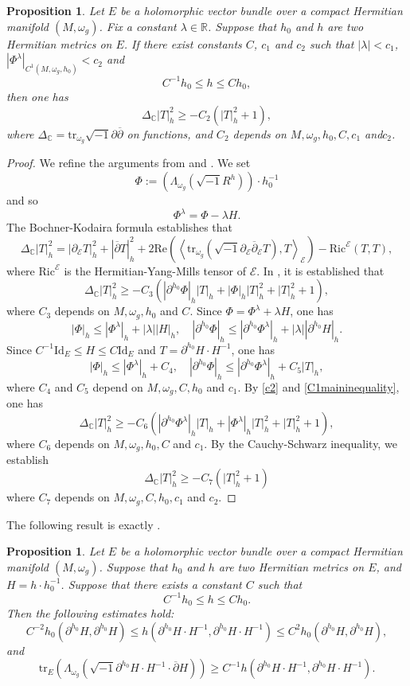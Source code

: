 \documentclass[12pt, reqno]{amsart}
\newcommand\sE{{\mathscr E}}
\newcommand\bp{{\bar\partial}}
\theoremstyle{plain}
\newtheorem{prop}[thm]{Proposition}
\theoremstyle{definition}
\newcommand{\bproposition}{\begin{prop}}
\newcommand{\eproposition}{\end{prop}}
\newcommand{\bproof}{\begin{proof}}
\newcommand{\eproof}{\end{proof}}
\newcommand{\sq}{\sqrt{-1}}
\newcommand{\p}{\partial}
\renewcommand{\bar}{\overline}
\newcommand{\beq}{\begin{equation}}
\newcommand{\eeq}{\end{equation}}
\renewcommand{\bp}{\bar{\partial}}
\renewcommand{\>}{\rightarrow}
\newcommand{\C}{{\mathbb C}}
\newcommand{\R}{{\mathbb R}}
\renewcommand{\>}{\rightarrow}
\renewcommand{\p}{{\partial}}
\renewcommand{\bp}{{\bar{\partial}}}
\newcommand{\om}{\omega}
\renewcommand{\bar}{\overline}
\newcommand{\smo}{\sqrt{-1}}
\numberwithin{equation}{section} %
\begin{document}
\bproposition
\label{DeltaS} Let $E$ be a holomorphic vector bundle over  a compact Hermitian manifold $(M,\omega_g)$. Fix a constant $\lambda\in \R$.  Suppose that $h_0$ and $h$ are two Hermitian metrics on $E$.   If there exist constants  $C$, $c_1$ and $c_2$ such that $|\lambda|<c_1$, $|\Phi^\lambda|_{C^1(M,\omega_g, h_0)}<c_2$
and 
\beq C^{-1}h_0\leq h\leq Ch_0, \eeq
then
one has
\beq \Delta_{\C} |T|_h^2\geq - C_{2}\left(|T|^2_h+1\right), \eeq
where $\Delta_\C =\mathrm{tr}_{\omega_g}\sq \p\bp$ on functions, and $C_{2}$ depends on $M,\omega_g,  h_0, C, c_1$ and$ c_2$.
\eproposition

\bproof We refine the arguments from \cite{WYY26+} and \cite{FWYY26+}.  We set $$ \Phi:= \left(\Lambda_{\omega_g}\left(\smo R^{{h}}\right)\right)\cdot h_0^{-1}$$ and so
\beq \Phi^\lambda=\Phi-\lambda H.\eeq
The Bochner-Kodaira formula establishes that
\beq \Delta_{\C} |T|_h^2 = |\p_\sE T|_h^2 + |\bar\p T|_h^2 + 2\mathrm{Re}\left(\left\langle \mathrm{tr}_{\omega_g}\left(\smo \p_\sE\bar\p_\sE T\right), T \right\rangle_\sE \right) - \mathrm{Ric}^\sE(T,T),\label{c30} \eeq
where $\mathrm{Ric}^\sE$ is the Hermitian-Yang-Mills tensor of $\sE$. In \cite[Proposition~4.6]{FWYY26+}, it is established that
\beq \Delta_{\C} |T|_h^2 \geq -C_{3}\left(|\p^{h_0}\Phi|_h|T|_h+ |\Phi|_h |T|^2_h+|T|^2_h+1\right), \label{C1maininequality} \eeq
where $C_{3}$  depends on $M, \omega_g, h_0$ and $C$.
Since $\Phi=\Phi^\lambda+\lambda H$, one has
\beq
|\Phi|_h\leq |\Phi^\lambda|_h+|\lambda||H|_h, \quad
|\p^{h_0}\Phi|_h\leq |\p^{h_0}\Phi^\lambda|_h+|\lambda||\p^{h_0}H|_h.
\eeq
Since
$C^{-1}\mathrm{Id}_E\leq H\leq C\mathrm{Id}_E$ and $ T=\p^{h_0}H\cdot H^{-1}$,
one has
\beq
|\Phi|_h\leq |\Phi^\lambda|_h+C_4, \quad
|\p^{h_0}\Phi|_h\leq |\p^{h_0}\Phi^\lambda|_h+C_5|T|_h,\label{c2}
\eeq
where $C_4$ and $C_5$ depend on $M,\om_g,C,h_0$ and $c_1$. By \eqref{c2} and \eqref{C1maininequality}, one has
\beq
\Delta_{\C} |T|_h^2 \geq-C_{6}\left(|\p^{h_0}\Phi^\lambda|_h|T|_h+|\Phi^\lambda|_h|T|^2_h +|T|^2_h+1\right),
\eeq
where $C_{6}$  depends on $M, \omega_g, h_0, C$ and $c_1$. By   the  Cauchy-Schwarz inequality,  we establish   \beq \Delta_{\C} |T|_h^2\geq - C_{7}\left(|T|^2_h+1\right) \eeq
where $ C_{7}$ depends on $M,\omega_g, C, h_0,c_1$ and $c_2$.
\eproof


\noindent The following result is exactly \cite[Proposition~4.4]{FWYY26+}.

\bproposition
\label{W12estimate}   Let $E$ be a holomorphic vector bundle over  a compact Hermitian manifold $(M,\omega_g)$. Suppose that $h_0$ and $h$ are two Hermitian metrics on $E$, and $H=h\cdot h_0^{-1}$.
Suppose that there exists a constant $C$ such that
\beq C^{-1}h_0\leq h\leq Ch_0. \eeq
Then the following estimates hold:
\beq C^{-2} h_0(\p^{h_0} H, \p^{h_0} H) \leq h(\p^{h_0} H\cdot H^{-1}, \p^{h_0} H\cdot H^{-1}) \leq C^2 h_0(\p^{h_0} H, \p^{h_0} H), \label{c15}\eeq   and
\beq \mathrm{tr}_E\left(\Lambda_{\omega_g}\left(\sq \p^{h_0} H\cdot H^{-1}\cdot \bp H\right)\right)\geq C^{-1} h\left(\p^{h_0}H\cdot H^{-1}, \p^{h_0}H\cdot H^{-1}\right). \label{estimate2}\eeq
\eproposition
\end{document}
